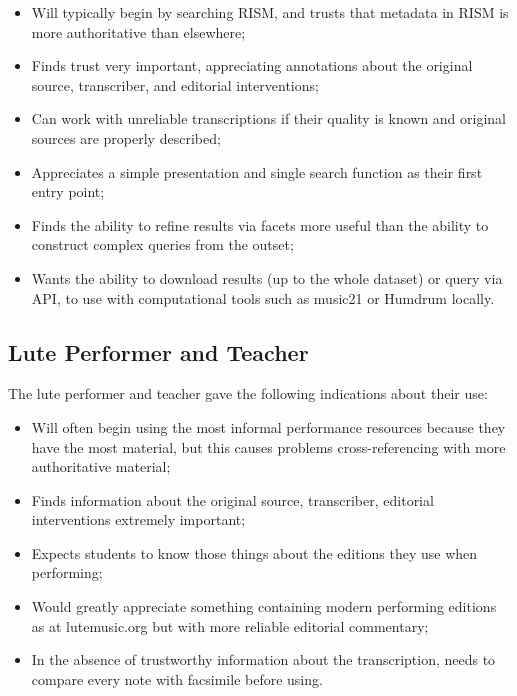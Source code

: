 \documentclass[sigconf]{acmart}
\begin{document}
\begin{sloppypar}
  \begin{itemize}
  \item Will typically begin by searching RISM, and trusts that
    metadata in RISM is more authoritative than elsewhere;
  \item Finds trust very important, appreciating annotations about the
    original source, transcriber, and editorial interventions;
  \item Can work with unreliable transcriptions if their quality is
    known and original sources are properly described;
  \item Appreciates a simple presentation and single search function
    as their first entry point;
  \item Finds the ability to refine results via facets more useful
    than the ability to construct complex queries from the outset;
  \item Wants the ability to download results (up to the whole
    dataset) or query via API, to use with computational tools such
    as music21 or Humdrum locally.
  \end{itemize}
  
  \subsection{Lute Performer and Teacher}

  The lute performer and teacher gave the following indications about
  their use:

  \begin{itemize}
    \item Will often begin using the most informal performance
      resources because they have the most material, but this causes
      problems cross-referencing with more authoritative material;
    \item Finds information about the original source, transcriber,
      editorial interventions extremely important;
    \item Expects students to know those things about the editions
      they use when performing;
    \item Would greatly appreciate something containing modern
      performing editions as at lutemusic.org but with more reliable
      editorial commentary;
    \item In the absence of trustworthy information about the
      transcription, needs to compare every note with facsimile before
      using.
  \end{itemize}


\end{sloppypar}
\end{document}
